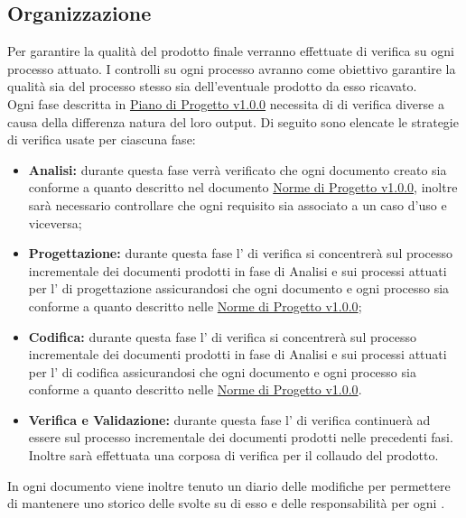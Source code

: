 \documentclass{scalatekids-article}
\begin{document}
\subsection{Organizzazione}
Per garantire la qualità del prodotto finale verranno effettuate  di verifica su ogni processo attuato. I controlli su ogni processo avranno come obiettivo garantire la qualità sia del processo stesso sia dell'eventuale prodotto da esso ricavato.\\
Ogni fase descritta in \href{run:./PianoDiProgetto\_v1.0.0.pdf}{Piano di Progetto v1.0.0} necessita di  di verifica diverse a causa della differenza natura del loro output. Di seguito sono elencate le strategie di verifica usate per ciascuna fase:
\begin{itemize}
\item\textbf{Analisi:} durante questa fase verrà verificato che ogni documento creato sia conforme a quanto descritto nel documento \href{run:../Interni/NormeDiProgetto\_v1.0.0.pdf}{Norme di Progetto v1.0.0}, inoltre sarà necessario controllare che ogni requisito sia associato a un caso d'uso e viceversa;
\item\textbf{Progettazione:} durante questa fase l' di verifica si concentrerà sul processo incrementale dei documenti prodotti in fase di Analisi e sui processi attuati per l' di progettazione assicurandosi che ogni documento e ogni processo sia conforme a quanto descritto nelle \href{run:../Interni/NormeDiProgetto\_v1.0.0.pdf}{Norme di Progetto v1.0.0};
\item\textbf{Codifica:} durante questa fase l' di verifica si concentrerà sul processo incrementale dei documenti prodotti in fase di Analisi e sui processi attuati per l' di codifica assicurandosi che ogni documento e ogni processo sia conforme a quanto descritto nelle \href{run:../Interni/NormeDiProgetto\_v1.0.0.pdf}{Norme di Progetto v1.0.0}.
\item\textbf{Verifica e Validazione:} durante questa fase l' di verifica continuerà ad essere sul processo incrementale dei documenti prodotti nelle precedenti fasi. Inoltre sarà effettuata una corposa  di verifica per il collaudo del prodotto.
\end{itemize}
In ogni documento viene inoltre tenuto un diario delle modifiche per permettere di mantenere uno storico delle  svolte su di esso e delle responsabilità per ogni .
\end{document}
